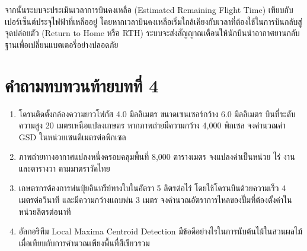 จากนั้นระบบจะประเมินเวลาการบินคงเหลือ (Estimated Remaining Flight Time) เทียบกับเปอร์เซ็นต์ประจุไฟฟ้าที่เหลืออยู่ โดยหากเวลาบินคงเหลือเริ่มใกล้เคียงกับเวลาที่ต้องใช้ในการบินกลับสู่จุดปล่อยตัว (Return to Home หรือ RTH) ระบบจะส่งสัญญาณเตือนให้นักบินนำอากาศยานกลับฐานเพื่อเปลี่ยนแบตเตอรี่อย่างปลอดภัย

\clearpage

\section*{คำถามทบทวนท้ายบทที่ 4}

\begin{enumerate}
    \item โดรนติดตั้งกล้องความยาวโฟกัส 4.0 มิลลิเมตร ขนาดเซนเซอร์กว้าง 6.0 มิลลิเมตร บินที่ระดับความสูง 20 เมตรเหนือแปลงเกษตร หากภาพถ่ายมีความกว้าง 4,000 พิกเซล จงคำนวณค่า GSD ในหน่วยเซนติเมตรต่อพิกเซล
    \item ภาพถ่ายทางอากาศแปลงหนึ่งครอบคลุมพื้นที่ 8,000 ตารางเมตร จงแปลงค่าเป็นหน่วย ไร่ งาน และตารางวา ตามมาตราวัดไทย
    \item เกษตรกรต้องการพ่นปุ๋ยอินทรีย์ทางใบในอัตรา 5 ลิตรต่อไร่ โดยใช้โดรนบินด้วยความเร็ว 4 เมตรต่อวินาที และมีความกว้างแถบพ่น 3 เมตร จงคำนวณอัตราการไหลของปั๊มที่ต้องตั้งค่าในหน่วยลิตรต่อนาที
    \item อัลกอริทึม Local Maxima Centroid Detection มีข้อดีอย่างไรในการนับต้นไม้ในสวนผลไม้เมื่อเทียบกับการคำนวณเพียงพื้นที่สีเขียวรวม
\end{enumerate}

\clearpage
